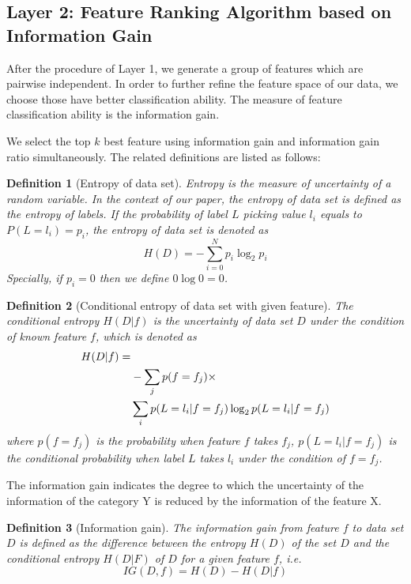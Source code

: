 \documentclass[journal]{IEEEtran}
\newtheorem{definition}{Definition}
\begin{document}
\subsection{Layer 2: Feature Ranking Algorithm based on Information Gain}

After the procedure of Layer 1, we generate a group of features which are pairwise independent. In order to further refine the feature space of our data, we choose those have better classification ability. The measure of feature classification ability is the information gain. 

We select the top $k$ best feature using information gain and information gain ratio simultaneously. The related definitions are listed as follows:

\begin{definition}[Entropy of data set]
    Entropy\cite{Shannon1948} is the measure of uncertainty of a random variable. In the context of our paper, the entropy of data set is defined as the entropy of labels. If the probability of label $L$ picking value $l_i$ equals to $P(L=l_i)=p_i$, the entropy of data set is denoted as 
\begin{equation}
    H(D) = -\sum_{i=0}^N p_i \log_2 p_i
\end{equation}
Specially, if $p_i=0$ then we define $0\log0 = 0$. 
\end{definition}

\begin{definition}[Conditional entropy of data set with given feature]
The conditional entropy $H(D|f)$ is the uncertainty of data set $D$ under the condition of known feature $f$, which is denoted as 
\begin{align}
     H(D|f)= & \notag \\
    & -\sum_{j} p(f=f_j) \times \notag \\
    & \sum_{i} p(L=l_i|f=f_j) \log_2 p(L=l_i|f=f_j)   
\end{align}
where $p(f=f_j)$ is the probability when feature $f$ takes $f_j$, $p(L=l_i | f=f_j)$ is the conditional probability when label $L$ takes $l_i$ under the condition of $f=f_j$.
\end{definition}

The information gain indicates the degree to which the uncertainty of the information of the category Y is reduced by the information of the feature X.

\begin{definition}[Information gain]
    The information gain from feature $f$ to data set $D$ is defined as the difference between the entropy $H(D)$ of the set $D$ and the conditional entropy $H(D|F)$ of $D$ for a given feature $f$, i.e.
\begin{equation}
    IG(D, f) = H(D) - H(D|f)
\end{equation}
\end{definition}
\end{document}
